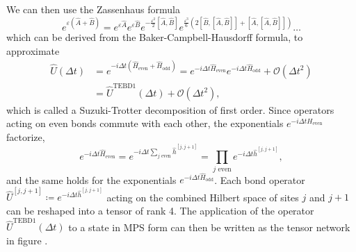 We can then use the Zassenhaus formula
\begin{equation}
	e^{\varepsilon(\hat{A}+\hat{B})} = e^{\varepsilon \hat{A}} e^{\varepsilon \hat{B}} e^{-\frac{\varepsilon^2}{2}[\hat{A}, \hat{B}]} e^{\frac{\varepsilon^3}{6}\left(2[\hat{B},[\hat{A},\hat{B}]]+[\hat{A},[\hat{A},\hat{B}]]\right)} \dots
\end{equation}
which can be derived from the Baker-Campbell-Hausdorff formula, to approximate
\begin{equation}
	\label{eq:mps_first_order_tebd}
	\begin{split}
		\hat{U}(\Delta t) &= e^{-i\Delta t\left(\hat{H}_\text{even} + \hat{H}_\text{odd}\right)} = e^{-i\Delta t\hat{H}_\text{even}}e^{-i\Delta t\hat{H}_\text{odd}} + \mathcal{O}\left(\Delta t^2\right) \\
		&= \hat{U}^\text{TEBD1}(\Delta t) + \mathcal{O}\left(\Delta t^2\right),
	\end{split}
\end{equation}
which is called a Suzuki-Trotter decomposition of first order. Since operators acting on even bonds commute with each other, the exponentials $e^{-i\Delta tH_\text{even}}$ factorize,
\begin{equation}
	e^{-i\Delta t\hat{H}_\text{even}} = e^{-i\Delta t\sum_{j \text{ even}} \hat{h}^{[j, j+1]}} = \prod_{j \text{ even}} e^{-i\Delta t \hat{h}^{[j, j+1]}},
\end{equation}
and the same holds for the exponentials $e^{-i\Delta t\hat{H}_\text{odd}}$. Each bond operator $\hat{U}^{[j, j+1]} \coloneqq e^{-i\Delta t \hat{h}^{[j, j+1]}}$ acting on the combined Hilbert space of sites $j$ and $j+1$ can be reshaped into a tensor of rank 4. The application of the operator $\hat{U}^\text{TEBD1}(\Delta t)$ to a state in MPS form can then be written as the tensor network in figure .
